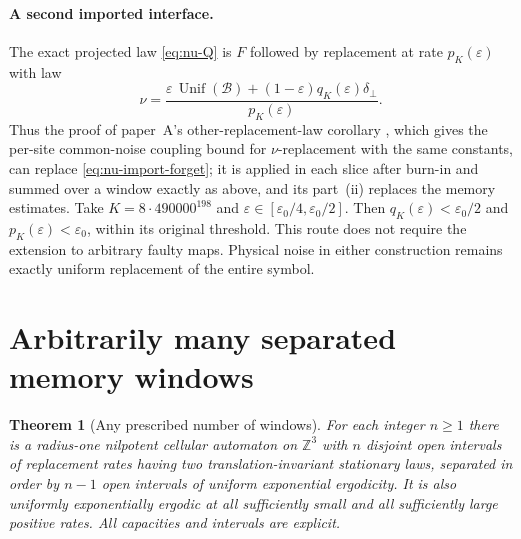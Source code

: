 \documentclass[11pt]{article}
\theoremstyle{plain}
\newtheorem{theorem}{Theorem}[section]
\theoremstyle{definition}
\theoremstyle{remark}
\newcommand{\Z}{\mathbb Z}
\newcommand{\eps}{\varepsilon}
\begin{document}
\paragraph{A second imported interface.}
The exact projected law \eqref{eq:nu-Q} is $F$ followed by replacement at rate $p_K(\eps)$ with law
\[
 \nu=\frac{\eps\,\operatorname{Unif}(\mathcal B)
 +(1-\eps)q_K(\eps)\delta_\bot}{p_K(\eps)}.
\]
Thus the proof of paper~A's other-replacement-law corollary \cite[Corollary~8.6 and Remark~9.22]{DM26A}, which gives the per-site common-noise coupling bound for $\nu$-replacement with the same constants, can replace \eqref{eq:nu-import-forget}; it is applied in each slice after burn-in and summed over a window exactly as above, and its part~(ii) replaces the memory estimates. Take $K=8\cdot490000^{198}$ and $\eps\in[\eps_0/4,\eps_0/2]$. Then $q_K(\eps)<\eps_0/2$ and $p_K(\eps)<\eps_0$, within its original threshold. This route does not require the extension to arbitrary faulty maps. Physical noise in either construction remains exactly uniform replacement of the entire symbol.

\section{Arbitrarily many separated memory windows}\label{sec:nu-many-windows}

\begin{theorem}[Any prescribed number of windows]\label{thm:nu-windows}
For each integer $n\ge1$ there is a radius-one nilpotent cellular automaton on $\Z^3$ with $n$ disjoint open intervals of replacement rates having two translation-invariant stationary laws, separated in order by $n-1$ open intervals of uniform exponential ergodicity. It is also uniformly exponentially ergodic at all sufficiently small and all sufficiently large positive rates. All capacities and intervals are explicit.
\end{theorem}
\end{document}
